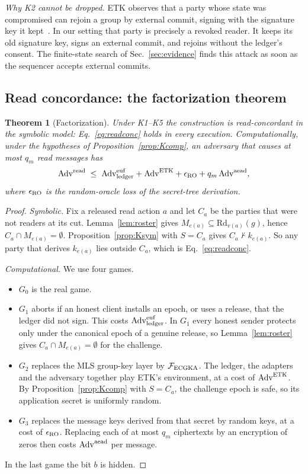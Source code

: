 \documentclass[aps,prx,reprint,superscriptaddress,nofootinbib,floatfix]{revtex4-2}
\newtheorem{theorem}{Theorem}
\theoremstyle{remark}
\newcommand{\Rd}{\mathrm{Rd}}             %
\newcommand{\cut}{v}                      %
\newcommand{\roster}{M}
\newcommand{\derives}{\vdash}
\newcommand{\Adv}{\mathrm{Adv}}
\begin{document}
\emph{Why K2 cannot be dropped.} ETK observes that a party whose state was compromised can rejoin a group by external commit, signing with the signature key it kept~\cite{etk}. In our setting that party is precisely a revoked reader. It keeps its old signature key, signs an external commit, and rejoins without the ledger's consent. The finite-state search of Sec.~\ref{sec:evidence} finds this attack as soon as the sequencer accepts external commits.

\subsection{Read concordance: the factorization theorem}

\begin{theorem}[Factorization]\label{thm:read}
Under K1--K5 the construction is read-concordant in the symbolic model: Eq.~\eqref{eq:readconc} holds in every execution. Computationally, under the hypotheses of Proposition~\ref{prop:Kcomp}, an adversary that causes at most $q_m$ read messages has
\begin{equation}
\Adv^{\rm read}\;\le\;\Adv^{\rm euf}_{\rm ledger}+\Adv^{\rm ETK}+\epsilon_{\rm RO}+q_m\,\Adv^{\rm aead},
\label{eq:readbound}
\end{equation}
where $\epsilon_{\rm RO}$ is the random-oracle loss of the secret-tree derivation.
\end{theorem}
\begin{proof}
\emph{Symbolic.} Fix a released read action $a$ and let $C_a$ be the parties that were not readers at its cut. Lemma~\ref{lem:roster} gives $\roster_{e(a)}\subseteq\Rd_{\cut(a)}(g)$, hence $C_a\cap\roster_{e(a)}=\emptyset$. Proposition~\ref{prop:Ksym} with $S=C_a$ gives $C_a\not\derives k_{e(a)}$. So any party that derives $k_{e(a)}$ lies outside $C_a$, which is Eq.~\eqref{eq:readconc}.

\emph{Computational.} We use four games.
\begin{itemize}
\item $G_0$ is the real game.
\item $G_1$ aborts if an honest client installs an epoch, or uses a release, that the ledger did not sign. This costs $\Adv^{\rm euf}_{\rm ledger}$. In $G_1$ every honest sender protects only under the canonical epoch of a genuine release, so Lemma~\ref{lem:roster} gives $C_a\cap\roster_{e(a)}=\emptyset$ for the challenge.
\item $G_2$ replaces the MLS group-key layer by $\mathcal F_{\rm ECGKA}$. The ledger, the adapters and the adversary together play ETK's environment, at a cost of $\Adv^{\rm ETK}$. By Proposition~\ref{prop:Kcomp} with $S=C_a$, the challenge epoch is safe, so its application secret is uniformly random.
\item $G_3$ replaces the message keys derived from that secret by random keys, at a cost of $\epsilon_{\rm RO}$. Replacing each of at most $q_m$ ciphertexts by an encryption of zeros then costs $\Adv^{\rm aead}$ per message.
\end{itemize}
In the last game the bit $b$ is hidden.
\end{proof}
\end{document}
